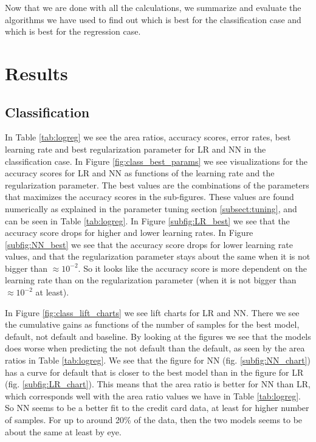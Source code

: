 \documentclass[12pt,a4paper,english]{article}
\begin{document}
Now that we are done with all the calculations, we summarize and evaluate the algorithms we have used to find out which is best for the classification case and which is best for the regression case.

\section{Results}
\label{sect:Results}
\subsection{Classification}
\label{subsect:result_class}
In Table \ref{tab:logreg} we see the area ratios, accuracy scores, error rates, best learning rate and best regularization parameter for LR and NN in the classification case. In Figure \ref{fig:class_best_params} we see visualizations for the accuracy scores for LR and NN as functions of the learning rate and the regularization parameter. The best values are the combinations of the parameters that maximizes the accuracy scores in the sub-figures. These values are found numerically as explained in the parameter tuning section \ref{subsect:tuning}, and can be seen in Table \ref{tab:logreg}. In Figure \ref{subfig:LR_best} we see that the accuracy score drops for higher and lower learning rates. In Figure \ref{subfig:NN_best} we see that the accuracy score drops for lower learning rate values, and that the regularization parameter stays about the same when it is not bigger than $\approx10^{-2}$. So it looks like the accuracy score is more dependent on the learning rate than on the regularization parameter (when it is not bigger than $\approx10^{-2}$ at least).

In Figure \ref{fig:class_lift_charts} we see lift charts for LR and NN. There we see the cumulative gains as functions of the number of samples for the best model, default, not default and baseline. By looking at the figures we see that the models does worse when predicting the not default than the default, as seen by the area ratios in Table \ref{tab:logreg}. We see that the figure for NN (fig. \ref{subfig:NN_chart}) has a curve for default that is closer to the best model than in the figure for LR (fig. \ref{subfig:LR_chart}). This means that the area ratio is better for NN than LR, which corresponds well with the area ratio values we have in Table \ref{tab:logreg}. So NN seems to be a better fit to the credit card data, at least for higher number of samples. For up to around 20\% of the data, then the two models seems to be about the same at least by eye.
\end{document}
